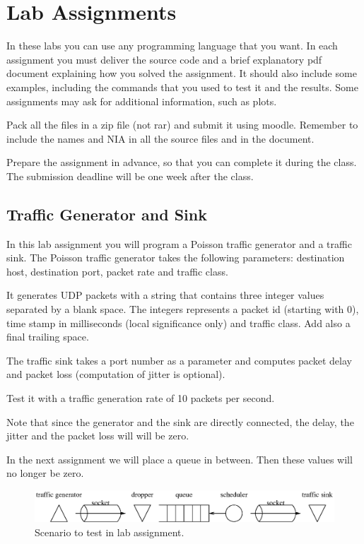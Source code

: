 \chapter{Lab Assignments}

In these labs you can use any programming language that you want. 
In each assignment you must deliver the source code and a brief explanatory pdf document explaining how you solved the assignment.
It should also include some examples, including the commands that you used to test it and the results.
Some assignments may ask for additional information, such as plots.

Pack all the files in a zip file (not rar) and submit it using moodle.
Remember to include the names and NIA in all the source files and in the document.

Prepare the assignment in advance, so that you can complete it during the class.
The submission deadline will be one week after the class.

\section{Traffic Generator and Sink}

In this lab assignment you will program a Poisson traffic generator and a traffic sink.
The Poisson traffic generator takes the following parameters:
destination host, destination port, packet rate and traffic class.

It generates UDP packets with a string that contains three integer values separated by a blank space. The integers represents a packet id (starting with 0), time stamp in milliseconds (local significance only) and traffic class. Add also a final trailing space.

The traffic sink takes a port number as a parameter and computes packet delay and packet loss (computation of jitter is optional).

Test it with a traffic generation rate of 10 packets per second.

Note that since the generator and the sink are directly connected, the delay, the jitter and the packet loss will will be zero.

In the next assignment we will place a queue in between.
Then these values will no longer be zero.

\begin{figure}[!h]
\centering
\includegraphics[width=\linewidth]{figures/scenario.eps}
\caption{Scenario to test in lab assignment.}
\label{fig:scenario}
\end{figure}

